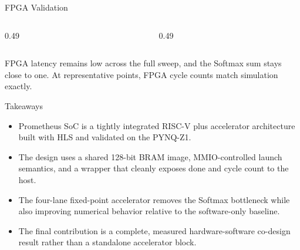 \documentclass[aspectratio=169]{beamer}
\begin{document}
\begin{frame}{FPGA Validation}
\begin{columns}[T,totalwidth=\textwidth]
\begin{column}{0.49\textwidth}
\centering
{}
\end{column}
\begin{column}{0.49\textwidth}
\centering
{}
\end{column}
\end{columns}
\vspace{1mm}
\small
FPGA latency remains low across the full sweep, and the Softmax sum stays close to one. At representative points, FPGA cycle counts match simulation exactly.
\end{frame}

\begin{frame}{Takeaways}
\begin{itemize}
\item Prometheus SoC is a tightly integrated RISC-V plus accelerator architecture built with HLS and validated on the PYNQ-Z1.
\item The design uses a shared 128-bit BRAM image, MMIO-controlled launch semantics, and a wrapper that cleanly exposes done and cycle count to the host.
\item The four-lane fixed-point accelerator removes the Softmax bottleneck while also improving numerical behavior relative to the software-only baseline.
\item The final contribution is a complete, measured hardware-software co-design result rather than a standalone accelerator block.
\end{itemize}
\end{frame}
\end{document}
